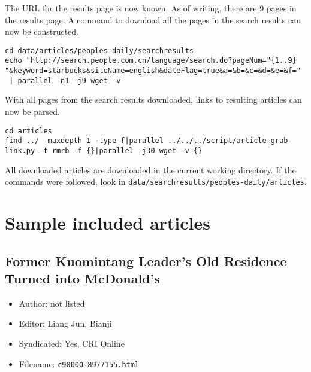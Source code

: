 The URL for the results page is now known. As of writing, there are 9 pages in
the results page. A command to download all the pages in the search results can
now be constructed.
\begin{verbatim}
cd data/articles/peoples-daily/searchresults
echo "http://search.people.com.cn/language/search.do?pageNum="{1..9}
"&keyword=starbucks&siteName=english&dateFlag=true&a=&b=&c=&d=&e=&f="
 | parallel -n1 -j9 wget -v
\end{verbatim}
With all pages from the search results downloaded, links to resulting articles
can now be parsed.
\begin{verbatim}
cd articles
find ../ -maxdepth 1 -type f|parallel ../../../script/article-grab-link.py -t rmrb -f {}|parallel -j30 wget -v {}
\end{verbatim}
All downloaded articles are downloaded in the current working directory. If the
commands were followed, look in
\texttt{data/searchresults/peoples-daily/articles}.

\chapter{Sample included articles}\label{appdx:news-articles-inc}

\section{Former Kuomintang Leader's Old Residence Turned into
McDonald's}

\begin{itemize}
	\item Author: not listed
	\item Editor: Liang Jun, Bianji
	\item Syndicated: Yes, CRI Online
	\item Filename: \texttt{c90000-8977155.html}
\end{itemize}

